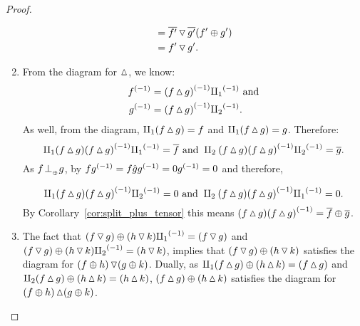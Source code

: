 \begin{proof}
\begin{enumerate}[{(}i{)}]
\begin{align*}
          & = \rst{f'} \tjdown \rst{g'}  (f'\+g') \\
          & = f'\tjdown g'.
      \end{align*}
    \item From the diagram for $\tjup$, we know:
      \begin{align*}
        \inv{f} &= \inv{(f\tjup g)} \icpa\text{ and}\\
        \inv{g} &= \inv{(f\tjup g)} \icpb.
      \end{align*}
      As well, from the diagram, $\cpa(f\tjup g) = f$ and $\cpa(f\tjup g) = g$.
      Therefore:
      \[
         \cpa(f\tjup g)\inv{(f\tjup g)} \icpa = \rst{f} \text{ and  }
          \cpb(f\tjup g)\inv{(f\tjup g)} \icpb = \rst{g}.
      \]
      As $f\tperp g$, by  $f\inv{g} = f \rg{g} \inv{g} = 0 \inv{g} = 0$ and therefore,

      \[
         \cpa(f\tjup g)\inv{(f\tjup g)} \icpb = 0 \text{ and  }
          \cpb(f\tjup g)\inv{(f\tjup g)} \icpa = 0.
      \]
      By Corollary~\ref{cor:split_plus_tensor} this means
      $(f\tjup g)\inv{(f\tjup g)} = \rst{f} \+ \rst{g}$.
    \item The fact that $(f\tjdown g)\+ (h\tjdown k)\icpa = (f\tjdown g)$ and
      $(f\tjdown g)\+ (h\tjdown k) \icpb = (h\tjdown k)$, implies that
      $(f\tjdown g)\+ (h\tjdown k)$ satisfies the diagram for $(f\+h)\tjdown(g\+k)$. Dually, as
      $\cpa (f\tjup g)\+ (h\tjup k) = (f\tjup g)$ and
      $\cpb(f\tjup g)\+ (h\tjup k) = (h\tjup k)$, $(f\tjup g)\+ (h\tjup k)$ satisfies
      the diagram for $(f\+h)\tjup(g\+k)$.
  \end{enumerate}
\end{proof}


